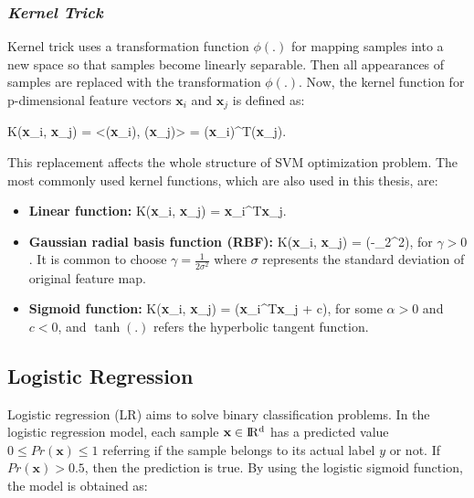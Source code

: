 \subsubsection*{\textit{Kernel Trick}}

Kernel trick uses a transformation function $\phi(.)$ for mapping samples into a new space so that samples become linearly separable. Then all appearances of samples are replaced with the transformation $\phi(.)$. Now, the kernel function for p-dimensional feature vectors $\textbf{x}_{i}$ and $\textbf{x}_{j}$ is defined as:

\be
\label{eq:kernel_function}
K(\textbf{x}_{i}, \textbf{x}_{j}) = <\phi(\textbf{x}_{i}), \phi(\textbf{x}_{j})> = \phi(\textbf{x}_{i})^{T}\phi(\textbf{x}_{j}).
\ee

This replacement affects the whole structure of SVM optimization problem. The most commonly used kernel functions, which are also used in this thesis, are:

\begin{itemize}
    \item \textbf{Linear function:}
    \be
    \label{eq:lienar_kernel_function}
    K(\textbf{x}_{i}, \textbf{x}_{j}) = \textbf{x}_{i}^{T}\textbf{x}_{j}.
    \ee
    
    \item \textbf{Gaussian radial basis function (RBF):}
    \be
    \label{eq:rbf_kernel_function}
    K(\textbf{x}_{i}, \textbf{x}_{j}) = \exp(-\gamma {}_{2}^{2})\:,
    \ee
    for $\gamma >0$. It is common to choose $\gamma =\frac{1}{2\sigma^{2}}$ where $\sigma$ represents the standard deviation of original feature map.
    
    \item \textbf{Sigmoid function:}
    \be
    \label{sigmoid_kernel_function}
    K(\textbf{x}_{i}, \textbf{x}_{j}) = \tanh(\alpha \textbf{x}_{i}^{T}\textbf{x}_{j} + c)\:,
    \ee
    for some $\alpha > 0$ and $c < 0$, and $\tanh(.)$ refers the hyperbolic tangent function.

\end{itemize}

\subsection{Logistic Regression}


Logistic regression (LR) aims to solve binary classification problems.
In the logistic regression model, each sample $\textbf{x} \in \rm I\!R^{d}$ has a predicted value $ 0 \leq Pr(\textbf{x}) \leq 1$ referring if the sample belongs to its actual label $y$ or not. If $Pr(\textbf{x})>0.5$, then the prediction is true. By using the logistic sigmoid function, the model is obtained as:

